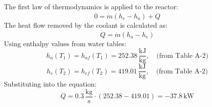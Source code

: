 The first law of thermodynamics is applied to the reactor:  
\[
0 = \dot{m}(h_e - h_a) + \dot{Q}
\]  
The heat flow removed by the coolant is calculated as:  
\[
\dot{Q} = \dot{m}(h_a - h_e)
\]  
Using enthalpy values from water tables:  
\[
h_a(T_1) = h_{af}(T_1) = 252.38 \, \frac{\text{kJ}}{\text{kg}}, \quad \text{(from Table A-2)}
\]  
\[
h_e(T_2) = h_{ef}(T_2) = 419.01 \, \frac{\text{kJ}}{\text{kg}}, \quad \text{(from Table A-2)}
\]  
Substituting into the equation:  
\[
\dot{Q} = 0.3 \, \frac{\text{kg}}{\text{s}} \cdot (252.38 - 419.01) = -37.8 \, \text{kW}
\]